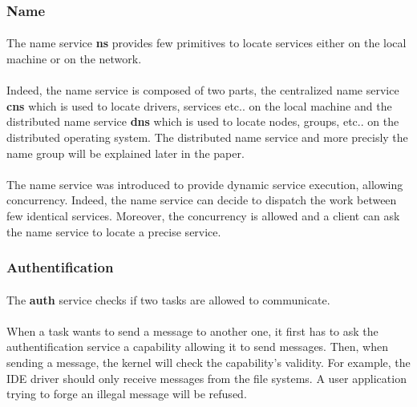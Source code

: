 \documentclass[10pt,a4wide]{article}
\begin{document}
\begin{multicols}{2}
\subsubsection{Name}

\paragraph{}

The name service \textbf{ns} provides few primitives to locate services
either on the local machine or on the network.

\paragraph{}

Indeed, the name service is composed of two parts, the centralized name
service \textbf{cns} which is used to locate drivers, services etc.. on
the local machine and the distributed name service \textbf{dns} which is
used to locate nodes, groups, etc.. on the distributed operating system.
The distributed name service and more precisly the name group will be
explained later in the paper.

\paragraph{}

The name service was introduced to provide dynamic service execution, allowing
concurrency. Indeed, the name service can decide to dispatch the work between
few identical services. Moreover, the concurrency is allowed and a client
can ask the name service to locate a precise service.

\subsubsection{Authentification}

\paragraph{}

The \textbf{auth} service checks if two tasks are allowed to communicate.

\paragraph{}

When a task wants to send a message to another one, it first has to ask
the authentification service a capability allowing it to send messages. Then,
when sending a message, the kernel will check the capability's validity.
For example, the IDE driver should only receive messages from the file systems.
A user application trying to forge an illegal message will be refused.


\end{multicols}
\end{document}
